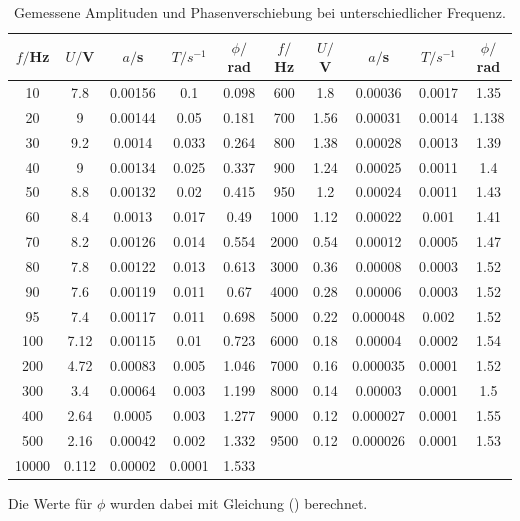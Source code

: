 \begin{table}[H]
\small
  \centering
  \caption{Gemessene Amplituden und Phasenverschiebung bei unterschiedlicher Frequenz.}
  \label{tab:Parameter}
  \begin{tabular}{c c c c c c c c c c}
    \toprule
    $f/$Hz & $U/$V & $a/$s & $T/s^{-1}$ & $\phi/$rad & $f/$Hz & $U/$V & $a/$s & $T/s^{-1}$ & $\phi/$rad \\
    \bottomrule
     10  & 7.8  & 0.00156 & 0.1 & 0.098 & 600 & 1.8 & 0.00036 & 0.0017 & 1.35 \\
     20  & 9 & 0.00144 & 0.05 & 0.181 & 700 & 1.56 & 0.00031 & 0.0014 & 1.138\\
     30  & 9.2& 0.0014 & 0.033 & 0.264 & 800 & 1.38 & 0.00028 & 0.0013 & 1.39\\
     40  & 9 & 0.00134 & 0.025 & 0.337 & 900 & 1.24 & 0.00025 & 0.0011 & 1.4\\
     50  & 8.8 & 0.00132 & 0.02 & 0.415 & 950 & 1.2 & 0.00024 & 0.0011 & 1.43\\
     60  & 8.4 & 0.0013 & 0.017 & 0.49 & 1000  & 1.12 & 0.00022 & 0.001 & 1.41\\
     70  & 8.2 & 0.00126 & 0.014 & 0.554 & 2000  & 0.54 & 0.00012 & 0.0005 & 1.47\\
     80  & 7.8 & 0.00122 & 0.013 & 0.613 & 3000  & 0.36 & 0.00008 & 0.0003 & 1.52\\
     90  & 7.6 & 0.00119 & 0.011 & 0.67 & 4000  & 0.28 & 0.00006 & 0.0003 & 1.52\\
     95  & 7.4 & 0.00117 & 0.011 & 0.698 & 5000  & 0.22 & 0.000048 & 0.002 & 1.52 \\
     100 & 7.12 & 0.00115 & 0.01 & 0.723 & 6000 & 0.18 & 0.00004 & 0.0002 & 1.54\\
     200 & 4.72 & 0.00083 & 0.005 & 1.046 & 7000  & 0.16 & 0.000035 & 0.0001 & 1.52\\
     300 & 3.4 & 0.00064 & 0.003 & 1.199 & 8000  & 0.14 & 0.00003 & 0.0001 & 1.5\\
     400 & 2.64 & 0.0005 & 0.003 & 1.277 & 9000  & 0.12 & 0.000027 & 0.0001 & 1.55\\
     500 & 2.16 & 0.00042 & 0.002 & 1.332 & 9500  & 0.12 & 0.000026 & 0.0001 & 1.53\\
     10000 & 0.112 & 0.00002 & 0.0001 & 1.533\\
    \bottomrule
  \end{tabular}
\end{table}
\noindent Die Werte für $\phi$ wurden dabei mit Gleichung () berechnet.


